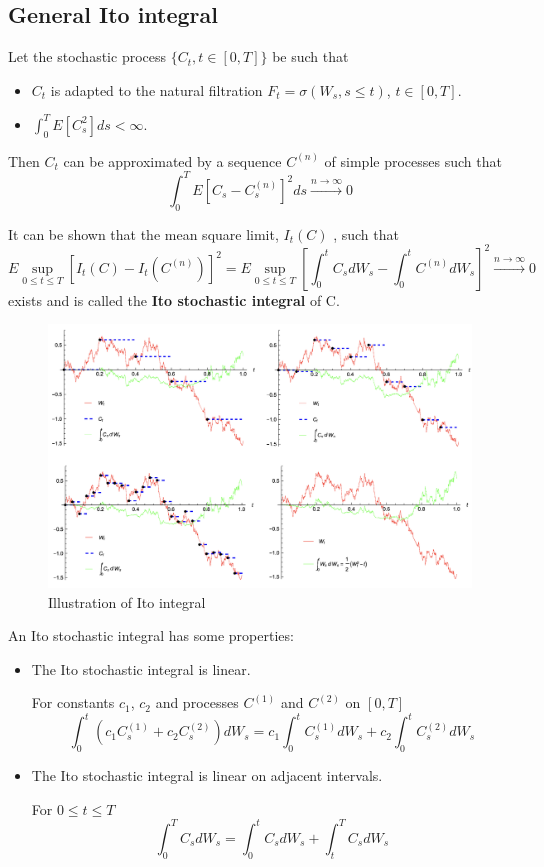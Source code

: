 \documentclass[11pt,a4paper]{book}
\theoremstyle{definition}\newtheorem{definition}{Definition}
\theoremstyle{definition}\newtheorem{fact}{Fact}
\theoremstyle{definition}\newtheorem{remark}{Remark}
\theoremstyle{definition}\newtheorem{ex}{Ex.}
\theoremstyle{definition}\newtheorem{project}{Project}
\theoremstyle{definition}\newtheorem{problem}{Problem}
\theoremstyle{definition}\newtheorem{example}{Example}
\numberwithin{theorem}{section}
\numberwithin{corollary}{chapter}
\numberwithin{assumption}{chapter}
\numberwithin{definition}{chapter}
\numberwithin{prop}{chapter}
\numberwithin{notation}{chapter}
\numberwithin{problem}{chapter}
\numberwithin{example}{chapter}
\numberwithin{fact}{chapter}
\numberwithin{ex}{chapter}
\begin{document}
\subsection{General Ito integral}
Let the stochastic process $\{C_t, t\in [0, T]\}$ be such that
\begin{itemize}
\item $C_t$ is adapted to the natural filtration $F_t = \sigma (W_s, s \leq t)$, $t \in [0,T]$.
\item $\int_0^T E[C_s^2] ds < \infty$.
\end{itemize}

Then $C_t$ can be approximated by a sequence $C^{(n)}$ of simple processes such that
$$ \int_0^T E[C_s - C_s^{(n)}]^2 ds \xrightarrow{n \rightarrow \infty} 0 $$

It can be shown that the mean square limit, $I_t(C)$ , such that
$$ E \sup_{0 \leq t \leq T} [I_t(C) - I_t(C^{(n)})]^2 = E \sup_{0 \leq t \leq T} [\int_0^t C_s dW_s - \int_0^t C^{(n)} dW_s]^2 \xrightarrow{n \rightarrow \infty} 0 $$
exists and is called the \textbf{Ito stochastic integral} of C.

\begin{figure}[H]
	\centering
	\includegraphics[scale=0.4]{Chapter 2/Chapter2_1.png}
	\caption{Illustration of Ito integral}
\end{figure}

An Ito stochastic integral has some properties:
\begin{itemize}
\item The Ito stochastic integral is linear.

For constants $c_1$, $c_2$ and processes $C^{(1)}$ and $C^{(2)}$ on $[0, T]$
$$ \int_0^t (c_1 C_s^{(1)} + c_2 C_s^{(2)}) dW_s = c_1 \int_0^t C_s^{(1)} dW_s + c_2 \int_0^t C_s^{(2)} dW_s $$
\item The Ito stochastic integral is linear on adjacent intervals.

For $0 \leq t \leq T$
$$ \int_0^T C_s dW_s = \int_0^t C_s dW_s + \int_t^T C_s dW_s $$
\end{itemize}
\end{document}
